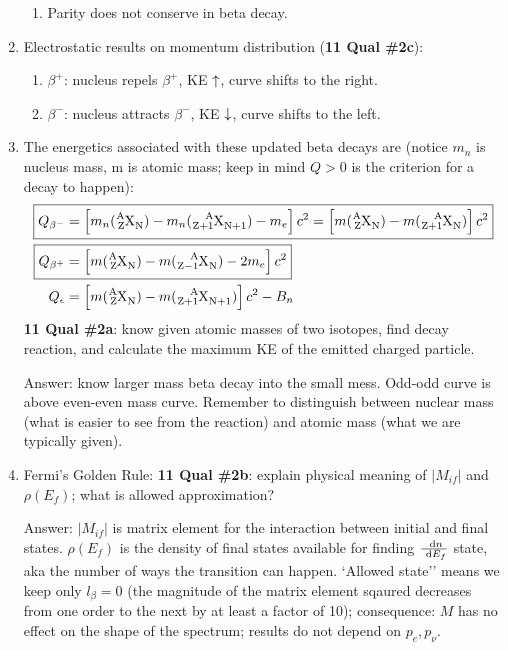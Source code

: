 \documentclass{school-22.101-notes}
\begin{document}
\begin{enumerate}
\begin{enumerate}
    \item Parity does not conserve in beta decay.
    \end{enumerate}
\item Electrostatic results on momentum distribution (\textbf{11 Qual \#2c}): 
    \begin{enumerate}
    \item $\beta^+$: nucleus repels $\beta^+$, KE $\uparrow$, curve shifts to the right.
    \item $\beta^-$: nucleus attracts $\beta^-$, KE $\downarrow$, curve shifts to the left. 
    \end{enumerate}
\item The energetics associated with these updated beta decays are (notice $m_n$ is nucleus mass, m is atomic mass; keep in mind $Q>0$ is the criterion for a decay to happen):
\begin{align}
\Aboxed{ Q_{\beta^-} &= \left[ m_n (\ce{^A_Z X_N}) - m_n (\ce{^A_{Z+1} X_{N+1}}) - m_e \right] c^2 = \left[ m (\ce{^A_Z X_N}) - m (\ce{^A_{Z+1} X_{N}}) \right] c^2 } \\
\Aboxed{ Q_{\beta^+} &= \left[ m (\ce{^A_Z X_N}) - m (\ce{^A_{Z-1} X_{N}}) - 2m_e \right] c^2 } \\
Q_{\epsilon} &= \left[ m (\ce{^A_Z X_N}) - m (\ce{^A_{Z+1} X_{N+1}}) \right] c^2 - B_n 
\end{align}
\textbf{11 Qual \#2a}: know given atomic masses of two isotopes, find decay reaction, and calculate the maximum KE of the emitted charged particle. 

Answer: know larger mass beta decay into the small mess. Odd-odd curve is above even-even mass curve. Remember to distinguish between nuclear mass (what is easier to see from the reaction) and atomic mass (what we are typically given). 

\item Fermi's Golden Rule:
\textbf{11 Qual \#2b}: explain physical meaning of $|M_{if}|$ and $\rho(E_f)$; what is allowed approximation? 

Answer: $|M_{if}|$ is matrix element for the interaction between initial and final states. $\rho(E_f)$ is the density of final states available for finding $\frac{\mbox{ }\mathrm{d} n}{\mbox{ }\mathrm{d} E_f}$ state, aka the number of ways the transition can happen. `Allowed state'' means we keep only $l_{\beta}=0$ (the magnitude of the matrix element sqaured decreases from one order to the next by at least a factor of 10); consequence: $M$ has no effect on the shape of the spectrum; results do not depend on $p_e, p_{\nu}$. 


\end{enumerate}
\end{document}
